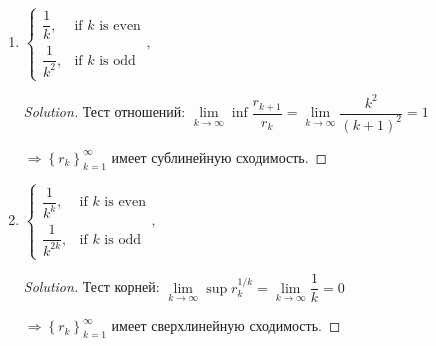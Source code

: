\documentclass[a4paper,12pt]{article}
\newenvironment{solution}
{\renewcommand\qedsymbol{$\blacksquare$}\begin{proof}[Solution]}{\end{proof}}
\newcommand{\dfr}{\dfrac}
\newcommand{\rw}{\rightarrow}
\newcommand{\iy}{\infty}
\newcommand{\Rw}{\Rightarrow}
\begin{document}
\begin{enumerate}
\begin{solution}
 $\Rw \left\{ r_k\right\}_{k=1}^{\iy}$ имеет сверхлинейную сходимость.
\end{solution}
\item 
$
\begin{cases}
\dfrac{1}{k},& \text{if $k$ is even}\\
\dfrac{1}{k^2},& \text{if $k$ is odd}
\end{cases}, 
$
\begin{solution}
	Тест отношений:
	$\lim\limits_{k \rw \infty}\inf \dfr{r_{k+1}}{r_k} = \lim\limits_{k \rw \infty} \dfr{k^2}{(k+1)^2} = 1$
	
	$\Rw \left\{ r_k\right\}_{k=1}^{\iy}$ имеет сублинейную сходимость.
	
\end{solution}
\item 
$
\begin{cases}
\dfrac{1}{k^k},& \text{if $k$ is even}\\
\dfrac{1}{k^{2k}},& \text{if $k$ is odd}
\end{cases}, 
$
\begin{solution}
Тест корней: 	
$\lim\limits_{k \rw \infty}\sup r_k^{1/k} = \lim\limits_{k \rw \infty}\dfr{1}{k} = 0	$

 $\Rw \left\{ r_k\right\}_{k=1}^{\iy}$ имеет сверхлинейную сходимость.
\end{solution}

\end{enumerate}
\end{document}
